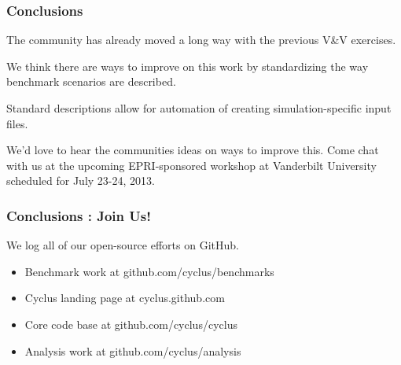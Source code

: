 
\begin{frame}
  \frametitle{Conclusions}
  The community has already moved a long way with the previous V\&V exercises.

  \vspace{0.4cm}

  We think there are ways to improve on this work by standardizing the way
  benchmark scenarios are described.

  \vspace{0.4cm}

  Standard descriptions allow for automation of creating simulation-specific
  input files.

  \vspace{0.4cm}

  We'd love to hear the communities ideas on ways to improve this. Come chat
  with us at the upcoming EPRI-sponsored workshop at Vanderbilt University
  scheduled for July 23-24, 2013.
\end{frame}

\begin{frame}
  \frametitle{Conclusions : Join Us!}
  We log all of our open-source efforts on GitHub.

  \begin{itemize}
    \item Benchmark work at github.com/cyclus/benchmarks
    \item Cyclus landing page at cyclus.github.com
    \item Core code base at github.com/cyclus/cyclus
    \item Analysis work at github.com/cyclus/analysis
  \end{itemize}

\end{frame}
